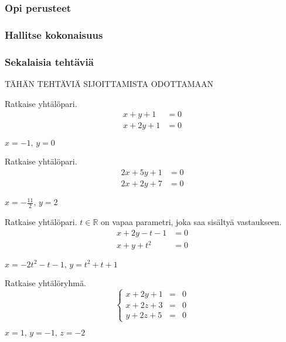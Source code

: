 \begin{tehtavasivu}

\subsubsection*{Opi perusteet}

\subsubsection*{Hallitse kokonaisuus}

\subsubsection*{Sekalaisia tehtäviä}

TÄHÄN TEHTÄVIÄ SIJOITTAMISTA ODOTTAMAAN

\begin{tehtava}
    Ratkaise yhtälöpari.
    \begin{align*}
        x+y+1 &= 0 \\
        x+2y+1 &=0
    \end{align*}
    \begin{vastaus}
        $x = -1, \, y = 0$
    \end{vastaus}
\end{tehtava}

\begin{tehtava}
    Ratkaise yhtälöpari.
    \begin{align*}
        2x+5y+1 &= 0 \\
        2x+2y+7 &=0
    \end{align*}
    \begin{vastaus}
        $x = -\frac{11}{2}, \, y = 2$
    \end{vastaus}
\end{tehtava}

\begin{tehtava}
    Ratkaise yhtälöpari. $t \in \mathbb{R}$ on vapaa parametri, joka saa sisältyä vastaukseen.
    \begin{align*}
        x+2y-t-1 &= 0 \\
        x+y+t^2 &=0
    \end{align*}
    \begin{vastaus}
        $x = -2t^2-t-1, \, y = t^2+t+1$
    \end{vastaus}
\end{tehtava}

\begin{tehtava}
    Ratkaise yhtälöryhmä.
	$$\left\{    
    \begin{array}{rcl}
        x+2y+1 &=&0 \\
        x+2z+3 &=&0 \\
        y+2z+5 &=&0
    \end{array}
    \right.$$
    \begin{vastaus}
        $x = 1, \, y = -1, \, z = -2$
    \end{vastaus}
\end{tehtava}


\end{tehtavasivu}

